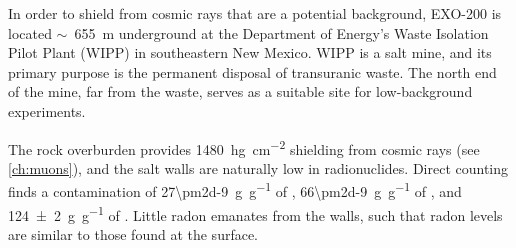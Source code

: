 \documentclass[herrin-thesis.tex]{subfiles}
\begin{document}
In order to shield from cosmic rays that are a potential background, EXO-200 is located \(\sim\)~\SI{655}{\m} underground at the Department of Energy's Waste Isolation Pilot Plant (WIPP) in southeastern New Mexico. WIPP is a salt mine, and its primary purpose is the permanent disposal of transuranic waste. The north end of the mine, far from the waste, serves as a suitable site for low-background experiments.

The rock overburden provides \SI{1480}{\hecto\g\per\square\cm} shielding from cosmic rays (see \cref{ch:muons}), and the salt walls are naturally low in radionuclides. Direct counting finds a contamination of \SI[per-mode=symbol]{27\pm2d-9}{\g\per\g} of , \SI[per-mode=symbol]{66\pm2d-9}{\g\per\g} of , and \SI[per-mode=symbol]{124\pm2}{\g\per\g} of . Little radon emanates from the walls, such that radon levels are similar to those found at the surface.
\end{document}
